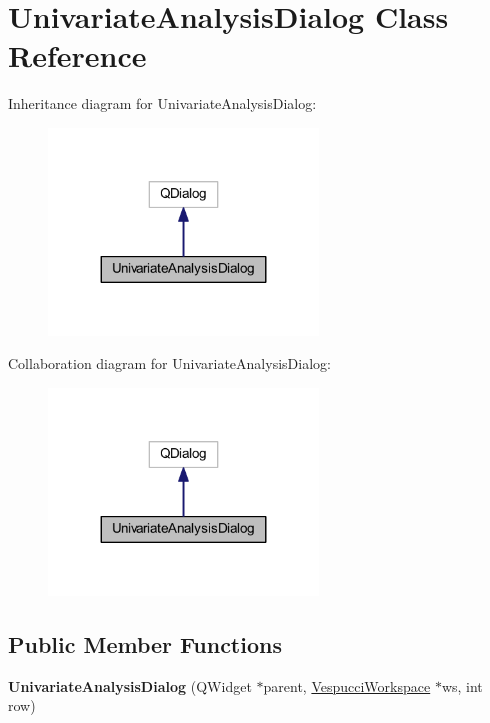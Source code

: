\hypertarget{class_univariate_analysis_dialog}{\section{Univariate\+Analysis\+Dialog Class Reference}
\label{class_univariate_analysis_dialog}
}


Inheritance diagram for Univariate\+Analysis\+Dialog\+:\nopagebreak
\begin{figure}[H]
\begin{center}
\leavevmode
\includegraphics[width=203pt]{class_univariate_analysis_dialog__inherit__graph}
\end{center}
\end{figure}


Collaboration diagram for Univariate\+Analysis\+Dialog\+:\nopagebreak
\begin{figure}[H]
\begin{center}
\leavevmode
\includegraphics[width=203pt]{class_univariate_analysis_dialog__coll__graph}
\end{center}
\end{figure}
\subsection*{Public Member Functions}
\begin{DoxyCompactItemize}
\item 
\hypertarget{class_univariate_analysis_dialog_a15c407242d8b555701945ba71a7dead8}{{\bfseries Univariate\+Analysis\+Dialog} (Q\+Widget $\ast$parent, \hyperlink{class_vespucci_workspace}{Vespucci\+Workspace} $\ast$ws, int row)}\label{class_univariate_analysis_dialog_a15c407242d8b555701945ba71a7dead8}

\end{DoxyCompactItemize}



